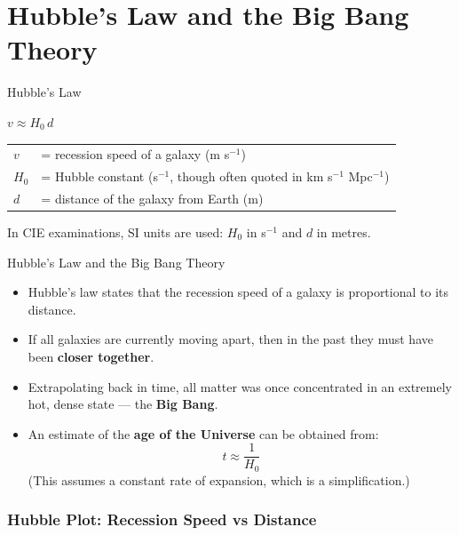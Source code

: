 \section{Hubble's Law and the Big Bang Theory}

\begin{formulabox}{Hubble's Law}
\begin{center}
\Large $v \approx H_0\,d$
\end{center}
\vspace{0.3em}
\begin{tabular}{@{}ll@{}}
$v$ & = recession speed of a galaxy (m s$^{-1}$) \\
$H_0$ & = Hubble constant (s$^{-1}$, though often quoted in km s$^{-1}$ Mpc$^{-1}$) \\
$d$ & = distance of the galaxy from Earth (m) \\
\end{tabular}
\vspace{0.4em}

In CIE examinations, SI units are used: $H_0$ in s$^{-1}$ and $d$ in metres.
\end{formulabox}

\begin{keybox}{Hubble's Law and the Big Bang Theory}
\begin{itemize}[itemsep=3pt]
  \item Hubble's law states that the recession speed of a galaxy is proportional to its distance.
  \item If all galaxies are currently moving apart, then in the past they must have been \textbf{closer together}.
  \item Extrapolating back in time, all matter was once concentrated in an extremely hot, dense state — the \textbf{Big Bang}.
  \item An estimate of the \textbf{age of the Universe} can be obtained from:
  $$t \approx \frac{1}{H_0}$$
  (This assumes a constant rate of expansion, which is a simplification.)
\end{itemize}
\end{keybox}

\subsubsection*{Hubble Plot: Recession Speed vs Distance}

